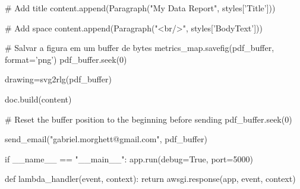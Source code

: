 \begin{python}
    # Add title
    content.append(Paragraph("My Data Report", styles['Title']))

    # Add space
    content.append(Paragraph("<br/>", styles['BodyText']))

    # Salvar a figura em um buffer de bytes
    metrics_map.savefig(pdf_buffer, format='png')
    pdf_buffer.seek(0)

    drawing=svg2rlg(pdf_buffer)

    doc.build(content)

    # Reset the buffer position to the beginning before sending
    pdf_buffer.seek(0)

    send_email("gabriel.morghett@gmail.com", pdf_buffer)

if __name__ == "__main__":
    app.run(debug=True, port=5000)

def lambda_handler(event, context):
    return awsgi.response(app, event, context)

\end{python}


